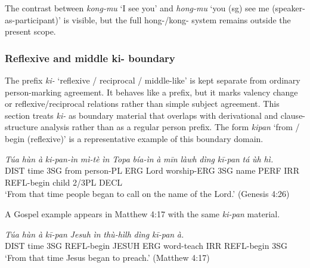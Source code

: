 \documentclass[
  11pt,
  a4paper,
]{article}
\newcommand{\tdim}[1]{\textit{#1}}
\newcommand{\tdimword}[1]{\textit{#1}}
\renewcommand{\textsc}[1]{{\footnotesize\MakeUppercase{#1}}}
\newcommand{\glossquote}[1]{`#1'}
\begin{document}
The contrast between \tdim{kong-mu} \glossquote{I see you} and
\tdim{hong-mu} \glossquote{you (sg) see me (speaker-as-participant)} is
visible, but the full hong-/kong- system remains outside the present
scope.

\subsubsection{Reflexive and middle ki-
boundary}\label{reflexive-and-middle-ki--boundary}

The prefix \tdim{ki-} \glossquote{reflexive / reciprocal / middle-like}
is kept separate from ordinary person-marking agreement. It behaves like
a prefix, but it marks valency change or reflexive/reciprocal relations
rather than simple subject agreement. This section treats \tdim{ki-} as
boundary material that overlaps with derivational and clause-structure
analysis rather than as a regular person prefix. The form \tdim{kipan}
\glossquote{from / begin (reflexive)} is a representative example of
this boundary domain.

\begin{exe}
\ex \label{ex:pref-kipan-gen4}
\gll \tdimword{Túa} \tdimword{hùn} \tdimword{à} \tdimword{ki-pan-ìn} \tdimword{mì-tè} \tdimword{ìn} \tdimword{Topa} \tdimword{bía-ìn} \tdimword{à} \tdimword{mīn} \tdimword{làwh} \tdimword{dìng} \tdimword{kī-pan} \tdimword{tá} \tdimword{ùh} \tdimword{hì.} \\
     \textsc{dist} time \textsc{3sg} from person-\textsc{pl} \textsc{erg} Lord worship-\textsc{erg} \textsc{3sg} name \textsc{perf} \textsc{irr} \textsc{refl}-begin child 2/3PL \textsc{decl} \\
\glt \glossquote{From that time people began to call on the name of the Lord.} (Genesis 4:26)
\end{exe}

A Gospel example appears in Matthew 4:17 with the same \tdim{ki-pan}
material.

\begin{exe}
\ex \label{ex:pref-kipan-matt4}
\gll \tdimword{Túa} \tdimword{hùn} \tdimword{à} \tdimword{kī-pan} \tdimword{Jesuh} \tdimword{ìn} \tdimword{thù-hìlh} \tdimword{dìng} \tdimword{kī-pan} \tdimword{à.} \\
     \textsc{dist} time \textsc{3sg} \textsc{refl}-begin \textsc{jesuh} \textsc{erg} word-teach \textsc{irr} \textsc{refl}-begin \textsc{3sg} \\
\glt \glossquote{From that time Jesus began to preach.} (Matthew 4:17)
\end{exe}
\end{document}
